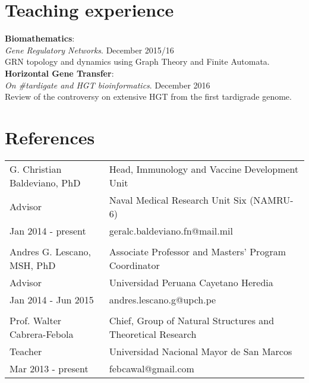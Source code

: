 \documentclass[margin,line]{res}
\begin{document}
\begin{resume}
\section{\sc Teaching experience}
{\bf Biomathematics}: \\ {\em Gene Regulatory Networks}. \hfill {December 2015/16}\\ GRN topology and dynamics using Graph Theory and Finite Automata. \\ %
{\bf Horizontal Gene Transfer}: \\ {\em On \#tardigate and HGT bioinformatics}. \hfill {December 2016}\\ Review of the controversy on extensive HGT from the first tardigrade genome. \\


\section{\sc References }

\begin{tabular}{ l l }
	G. Christian Baldeviano, PhD & Head, Immunology and Vaccine Development Unit \\
	Advisor & Naval Medical Research Unit Six (NAMRU-6)\\
	Jan 2014 - present & geralc.baldeviano.fn@mail.mil\\
	&\\
	Andres G. Lescano, MSH, PhD & Associate Professor and Masters' Program Coordinator\\
	Advisor & Universidad Peruana Cayetano Heredia\\
	Jan 2014 - Jun 2015 & andres.lescano.g@upch.pe\\
	&\\
	Prof. Walter Cabrera-Febola & Chief, Group of Natural Structures and Theoretical Research \\
	Teacher & Universidad Nacional Mayor de San Marcos\\
	Mar 2013 - present & febcawal@gmail.com\\	
\end{tabular}


\end{resume}
\end{document}
